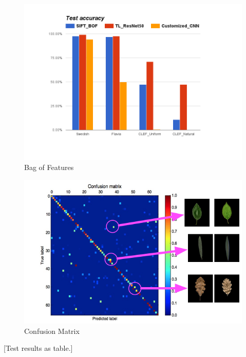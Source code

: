 \documentclass[journal, 10pt]{IEEEtran}
\begin{document}
\begin{figure}
  \centering
  \includegraphics[width=1.00\linewidth]{test_accuracy_with_customized_cnn}
  \caption{ Bag of Features }
  \label{fig:test_accuracy}
\end{figure}

\begin{figure}
  \centering
  \includegraphics[width=1.00\linewidth]{best_cm_uniform}
  \caption{ Confusion Matrix }
  \label{fig:best_cm_uniform}
\end{figure}

[Test results as table.]
\end{document}
